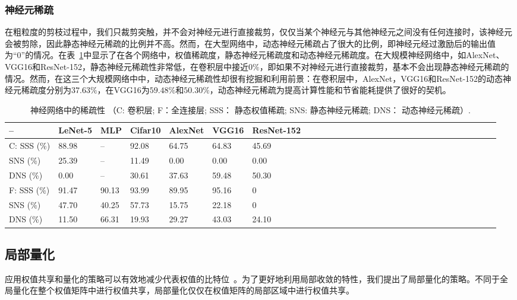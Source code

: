 \subsubsection{神经元稀疏}
在粗粒度的剪枝过程中，我们只裁剪突触，并不会对神经元进行直接裁剪，仅仅当某个神经元与其他神经元之间没有任何连接时，该神经元会被剪除，因此静态神经元稀疏的比例并不高。然而，在大型网络中，动态神经元稀疏占了很大的比例，即神经元经过激励后的输出值为“0”的情况。在表~\ref{tab:sparsities}中显示了在各个网络中，权值稀疏度，静态神经元稀疏度和动态神经元稀疏度。在大规模神经网络中，如AlexNet、VGG16和ResNet-152，静态神经元稀疏性非常低，在卷积层中接近$0\%$，即如果不对神经元进行直接裁剪，基本不会出现静态神经元稀疏的情况。然而，在这三个大规模网络中中，动态神经元稀疏性却很有挖掘和利用前景：在卷积层中，AlexNet，VGG16和ResNet-152的动态神经元稀疏度分别为$37.63\%$，在VGG16为$59.48\%$和$50.30\%$，动态神经元稀疏为提高计算性能和节省能耗提供了很好的契机。

\begin{table}[h]
\centering
\caption{\footnotesize 神经网络中的稀疏性 （C: 卷积层; F：全连接层; SSS： 静态权值稀疏; SNS: 静态神经元稀疏; DNS： 动态神经元稀疏）.}
\label{tab:sparsities}
\begin{tabular}{@{~}lll@{~}lll@{~}lll@{~}lll@{~}lll@{~}lll@{~}llllllllllll}
\toprule
-- & LeNet-5 & MLP & Cifar10 & AlexNet & VGG16 & ResNet-152 \\
\midrule
C: SSS (\%)& 88.98 	& -- 	& 92.08 & 64.75 & 64.83 & 45.69 \\
   SNS (\%)& 25.39	& -- 	& 11.49 & 0.00 	& 0.00 	& 0.00 \\
   DNS (\%)& 0.00	& -- 	& 30.61 & 37.63	& 59.48 & 50.30 \\
\hline
F: SSS (\%)& 91.47	& 90.13	& 93.99 & 89.95	& 95.16 & 0 \\
   SNS (\%)& 47.70	& 40.25 & 57.73 & 15.75 & 22.18	& 0 \\
   DNS (\%)& 11.50	& 66.31 & 19.93	& 29.27 & 43.03	& 24.10 \\
\bottomrule
\end{tabular}
\end{table}

\subsection{局部量化}

应用权值共享和量化的策略可以有效地减少代表权值的比特位~\cite{han2015deep}。为了更好地利用局部收敛的特性，我们提出了局部量化的策略。不同于全局量化在整个权值矩阵中进行权值共享，局部量化仅仅在权值矩阵的局部区域中进行权值共享。

